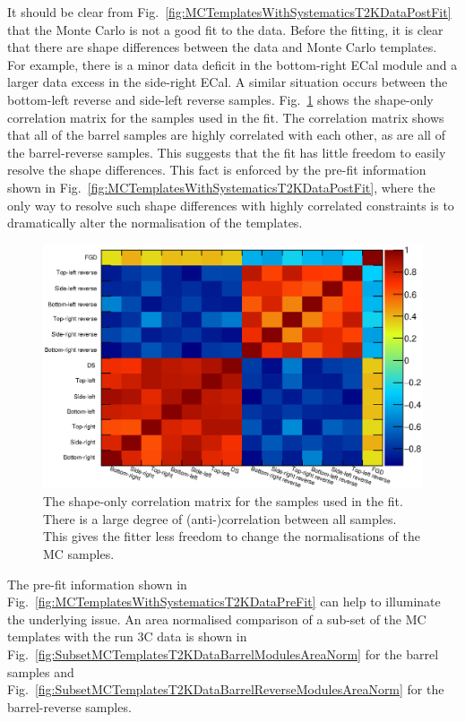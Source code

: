\newline
\newline
It should be clear from Fig.~\ref{fig:MCTemplatesWithSystematicsT2KDataPostFit} that the Monte Carlo is not a good fit to the data.  Before the fitting, it is clear that there are shape differences between the data and Monte Carlo templates.  For example, there is a minor data deficit in the bottom-right ECal module and a larger data excess in the side-right ECal.  A similar situation occurs between the bottom-left reverse and side-left reverse samples.  Fig.~\ref{fig:ShapeCorrelationMatrix} shows the shape-only correlation matrix for the samples used in the fit.  The correlation matrix shows that all of the barrel samples are highly correlated with each other, as are all of the barrel-reverse samples.  This suggests that the fit has little freedom to easily resolve the shape differences.  This fact is enforced by the pre-fit information shown in Fig.~\ref{fig:MCTemplatesWithSystematicsT2KDataPostFit}, where the only way to resolve such shape differences with highly correlated constraints is to dramatically alter the normalisation of the templates. 
\begin{figure}
  \centering
  \includegraphics[width=15cm]{images/measurement/data/ShapeCorrelationMatrix.eps}
  \caption{The shape-only correlation matrix for the samples used in the fit.  There is a large degree of (anti-)correlation between all samples.  This gives the fitter less freedom to change the normalisations of the MC samples.}
  \label{fig:ShapeCorrelationMatrix}
\end{figure}
The pre-fit information shown in Fig.~\ref{fig:MCTemplatesWithSystematicsT2KDataPreFit} can help to illuminate the underlying issue.  An area normalised comparison of a sub-set of the MC templates with the run 3C data is shown in Fig.~\ref{fig:SubsetMCTemplatesT2KDataBarrelModulesAreaNorm} for the barrel samples and Fig.~\ref{fig:SubsetMCTemplatesT2KDataBarrelReverseModulesAreaNorm} for the barrel-reverse samples.  
